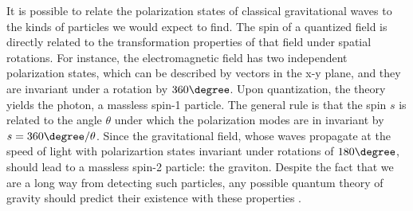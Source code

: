 It is possible to relate the polarization states of classical gravitational waves to the kinds of particles we would expect to find.
The spin of a quantized field is directly related to the transformation properties of that field under spatial rotations.
For instance, the electromagnetic field has two independent polarization states, which can be described by vectors in the x-y plane, and they are invariant under a rotation by $360 \degree$.
Upon quantization, the theory yields the photon, a massless spin-1 particle.
The general rule is that the spin $s$ is related to the angle $\theta$ under which the polarization modes are in invariant by $s = 360 \degree /\theta$.
Since the gravitational field, whose waves propagate at the speed of light with polarizartion states invariant under rotations of $180 \degree$, should lead to a massless spin-2 particle: the graviton.
Despite the fact that we are a long way from detecting such particles, any possible quantum theory of gravity should predict their existence with these properties \cite{carroll_spacetime_2003}.




